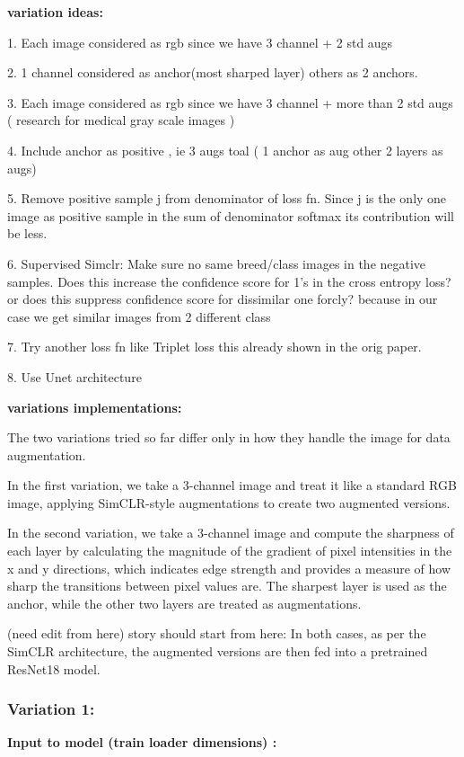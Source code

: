 \documentclass[12pt,twoside,a4paper,parskip]{scrbook} %
\begin{document}
\textbf{variation ideas:}

1. Each image considered as rgb since we have 3 channel + 2 std augs

2. 1 channel considered as anchor(most sharped layer) others as 2 anchors.

3. Each image considered as rgb since we have 3 channel + more than 2 std augs ( research for medical gray scale images )

4. Include anchor as positive , ie 3 augs  toal ( 1 anchor as aug other 2 layers as augs)

5. Remove positive sample j from denominator of loss fn. Since j is the  only one image as positive sample in the sum of denominator softmax its contribution will be less.

6. Supervised Simclr: Make sure no same breed/class images in the negative samples. Does this increase the confidence score for 1's in the cross entropy loss? or does this suppress confidence score for dissimilar one forcly? because in our case we get similar images from 2 different class 

7. Try another loss fn like Triplet loss this already shown in the orig paper.

8. Use Unet architecture  

\textbf{variations implementations:}

The two variations tried so far differ only in how they handle the image for data augmentation. 

In the first variation, we take a 3-channel image and treat it like a standard RGB image, applying SimCLR-style augmentations to create two augmented versions.

In the second variation, we take a 3-channel image and compute the sharpness of each layer by calculating the magnitude of the gradient of pixel intensities in the x and y directions, which indicates edge strength and provides a measure of how sharp the transitions between pixel values are. The sharpest layer is used as the anchor, while the other two layers are treated as augmentations. 

(need edit from here)
story should start from here:
In both cases, as per the SimCLR architecture, the augmented versions are then fed into a pretrained ResNet18 model.

\subsubsection{Variation 1:}
\textbf{Input to model (train loader dimensions) :} 
\end{document}

